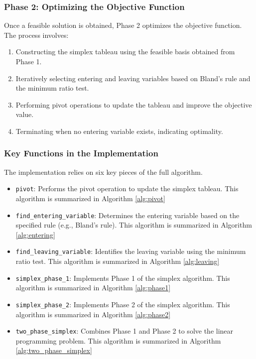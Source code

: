 \documentclass[conference]{IEEEtran}
\begin{document}
\subsubsection{Phase 2: Optimizing the Objective Function}
Once a feasible solution is obtained, Phase 2 optimizes the objective function. The process involves:
\begin{enumerate}
    \item Constructing the simplex tableau using the feasible basis obtained from Phase 1.
    \item Iteratively selecting entering and leaving variables based on Bland's rule and the minimum ratio test.
    \item Performing pivot operations to update the tableau and improve the objective value.
    \item Terminating when no entering variable exists, indicating optimality.
\end{enumerate}

\subsubsection{Key Functions in the Implementation}
The implementation relies on six key pieces of the full algorithm.
\begin{itemize}
    \item \texttt{pivot}: Performs the pivot operation to update the simplex tableau.
    This algorithm is summarized in Algorithm \ref{alg:pivot}
    \item \texttt{find\_entering\_variable}: Determines the entering variable based on the specified rule (e.g., Bland's rule).
    This algorithm is summarized in Algorithm \ref{alg:entering}
    \item \texttt{find\_leaving\_variable}: Identifies the leaving variable using the minimum ratio test.
    This algorithm is summarized in Algorithm \ref{alg:leaving}
    \item \texttt{simplex\_phase\_1}: Implements Phase 1 of the simplex algorithm.
    This algorithm is summarized in Algorithm \ref{alg:phase1}
    \item \texttt{simplex\_phase\_2}: Implements Phase 2 of the simplex algorithm.
    This algorithm is summarized in Algorithm \ref{alg:phase2}
    \item \texttt{two\_phase\_simplex}: Combines Phase 1 and Phase 2 to solve the linear programming problem.
    This algorithm is summarized in Algorithm \ref{alg:two_phase_simplex}
\end{itemize}
\end{document}
